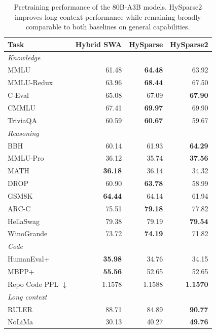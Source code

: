 \begin{table}[t]
    \centering
    \small
    \setlength{\tabcolsep}{10pt}
    \begin{tabular}{lrrr}
        \toprule
        \textbf{Task} & \textbf{Hybrid SWA} & \textbf{HySparse} & \textbf{HySparse2} \\
        \midrule
        \multicolumn{4}{l}{\textit{Knowledge}} \\
        MMLU & 61.48 & \textbf{64.48} & 63.92 \\
        MMLU-Redux & 63.96 & \textbf{68.44} & 67.50 \\
        C-Eval & 65.08 & 67.09 & \textbf{67.90} \\
        CMMLU & 67.41 & \textbf{69.97} & 69.90 \\
        TriviaQA & 60.59 & \textbf{60.67} & 59.67 \\
        \midrule
        \multicolumn{4}{l}{\textit{Reasoning}} \\
        BBH & 60.14 & 61.93 & \textbf{64.29} \\
        MMLU-Pro & 36.12 & 35.74 & \textbf{37.56} \\
        MATH & \textbf{36.18} & 36.14 & 34.32 \\
        DROP & 60.90 & \textbf{63.78} & 58.99 \\
        GSM8K & \textbf{64.44} & 64.14 & 61.94 \\
        ARC-C & 75.51 & \textbf{79.18} & 77.82 \\
        HellaSwag & 79.38 & 79.19 & \textbf{79.54} \\
        WinoGrande & 73.72 & \textbf{74.19} & 71.82 \\
        \midrule
        \multicolumn{4}{l}{\textit{Code}} \\
        HumanEval+ & \textbf{35.98} & 34.76 & 34.15 \\
        MBPP+ & \textbf{55.56} & 52.65 & 52.65 \\
        Repo Code PPL $\downarrow$ & 1.1578 & 1.1588 & \textbf{1.1570} \\
        \midrule
        \multicolumn{4}{l}{\textit{Long context}} \\
        RULER & 88.71 & 84.89 & \textbf{90.77} \\
        NoLiMa & 30.13 & 40.27 & \textbf{49.76} \\
        \bottomrule
    \end{tabular}
    \caption{Pretraining performance of the 80B-A3B models. HySparse2 improves long-context performance while remaining broadly comparable to both baselines on general capabilities.}
    \label{tab:v2-v1-pretrain}
\end{table}
